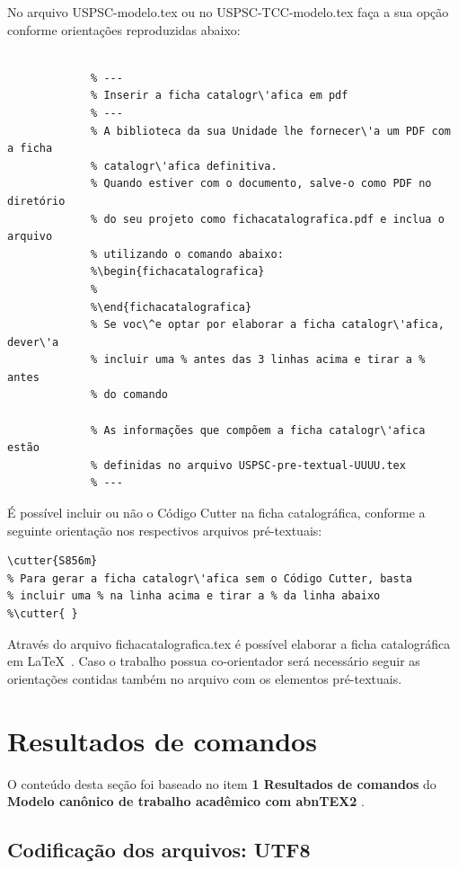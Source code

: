 No arquivo USPSC-modelo.tex ou no USPSC-TCC-modelo.tex faça a sua opção conforme orientações reproduzidas abaixo:

			 \begin{verbatim}
			 
			 % ---
			 % Inserir a ficha catalogr\'afica em pdf
			 % ---
			 % A biblioteca da sua Unidade lhe fornecer\'a um PDF com a ficha
			 % catalogr\'afica definitiva. 
			 % Quando estiver com o documento, salve-o como PDF no diretório
			 % do seu projeto como fichacatalografica.pdf e inclua o arquivo
			 % utilizando o comando abaixo:
			 %\begin{fichacatalografica}
			 %   
			 %\end{fichacatalografica}
			 % Se voc\^e optar por elaborar a ficha catalogr\'afica, dever\'a 
			 % incluir uma % antes das 3 linhas acima e tirar a % antes
			 % do comando 
			 
			 % As informações que compõem a ficha catalogr\'afica estão 
			 % definidas no arquivo USPSC-pre-textual-UUUU.tex
			 % ---
			 \end{verbatim} 
			 				
É possível incluir ou não o Código Cutter na ficha catalogr\'afica, conforme a seguinte orientação nos respectivos arquivos pr\'e-textuais:

\begin{verbatim}
\cutter{S856m}
% Para gerar a ficha catalogr\'afica sem o Código Cutter, basta 
% incluir uma % na linha acima e tirar a % da linha abaixo
%\cutter{ } 
\end{verbatim} 

Atrav\'es do arquivo fichacatalografica.tex \'e possível elaborar a ficha catalogr\'afica em \LaTeX\ . Caso o trabalho possua co-orientador ser\'a necess\'ario seguir as orientações contidas tamb\'em no arquivo com os elementos pr\'e-textuais.	 


\section{Resultados de comandos}\label{sec-divisoes}

O conteúdo desta seção foi baseado no item \textbf{1 Resultados de comandos} do \textbf{Modelo canônico de trabalho acad\^emico com abnTEX2} \cite{equipeabntex2}.

\subsection{Codificação dos arquivos: UTF8}

